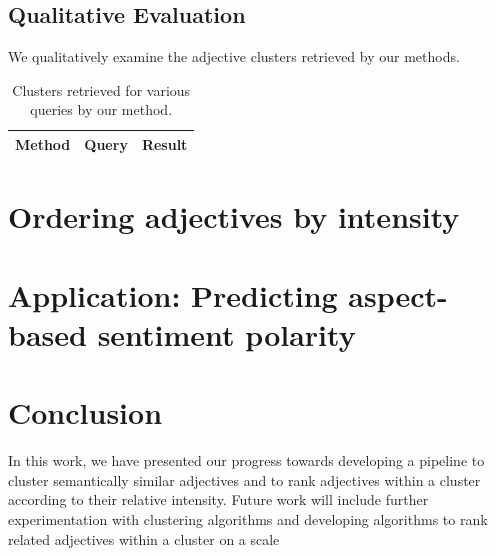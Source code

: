 \documentclass[11pt,a4paper]{article}
\begin{document}
\subsection{Qualitative Evaluation}

We qualitatively examine the adjective clusters retrieved by our methods.

\begin{table}[]
\centering
\begin{tabular}{@{}lll@{}}
\toprule
Method & Query & Result \\ \midrule

\bottomrule
\end{tabular}
\caption{Clusters retrieved for various queries by our method.}
\label{tab:clustering-qual-results}
\end{table}





\section{Ordering adjectives by intensity}


\section{Application: Predicting aspect-based sentiment polarity}



\section{Conclusion}

In this work, we have presented our progress towards developing a pipeline to cluster semantically similar adjectives and to rank adjectives within a cluster according to their relative intensity. Future work will include further experimentation with clustering algorithms and developing algorithms to rank related adjectives within a cluster on a scale

\end{document}
